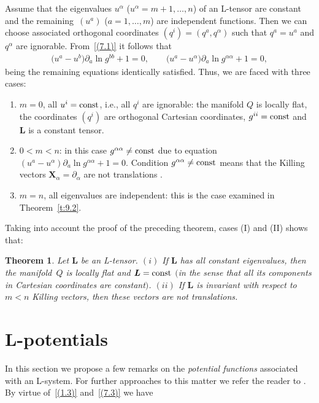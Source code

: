 \documentclass[10pt,a4paper]{amsart}
\def\bs{\boldsymbol}
\numberwithin{equation}{section}
\newtheorem{Theorem}{Theorem}[section]
 { \theoremstyle{definition}
\newtheorem{Notation}[Theorem]{Notation}
\newtheorem{Example}[Theorem]{Example}
\newtheorem{Remark}[Theorem]{Remark}
\newtheorem{Remarks}[Theorem]{Remarks}
 }
\begin{document}
Assume that the eigenvalues $u^\alpha$ ($u^\alpha=m+1,\ldots,n$) of an L-tensor are constant and the remaining~$(u^a)$ ($a=1,\ldots,m$) are independent functions. Then we can choose associated orthogonal coordinates $(q^i)=(q^a,q^\alpha)$ such that $q^a=u^a$ and $q^\alpha$ are ignorable. From~\eqref{(7.1)} it follows that
\begin{gather*}
\big(u^a-u^b\big) \partial_a\ln g^{bb}+1=0, \qquad
\big(u^a-u^\alpha\big) \partial_a\ln g^{\alpha\alpha}+1=0,
\end{gather*}
being the remaining equations identically satisf\/ied. Thus, we are faced with three cases:
\begin{enumerate}\itemsep=0pt
\item[(I)] $m=0$, all $u^i={\rm const}$, i.e., all $q^i$ are ignorable: the manifold $Q$ is locally f\/lat, the coordinates $(q^i)$
are orthogonal Cartesian coordinates, $g^{ii}={\rm const}$ and $\bs L$ is a constant tensor.

\item[(II)] $0<m<n$: in this case $g^{\alpha\alpha}\neq{\rm const}$ due to equation $(u^a-u^\alpha)\partial_a\ln g^{\alpha\alpha}+1=0$.
Condition $g^{\alpha\alpha}\neq{\rm const}$ means that the Killing vectors $\bs X_\alpha=\partial_\alpha$ are  not translations \cite[Section~52]{Eisenhart-1933}.

\item[(III)] $m=n$, all eigenvalues are independent: this is the case examined in Theorem~\ref{t:9.2}.
\end{enumerate}

Taking into account the proof of the preceding theorem, cases (I) and (II) shows that:

\begin{Theorem}\label{t:9.3}
Let $\bs L$ be an L-tensor.
$(i)$ If $\bs L$ has all constant eigenvalues, then the mani\-fold~$Q$ is locally flat and $\bs L={\rm const}$ $($in the sense that all its components in Cartesian coordinates are constant$)$.
$(ii)$ If $\bs L$ is invariant with respect to  $m<n$ Killing vectors, then these vectors are not translations.
\end{Theorem}


\section{L-potentials}\label{section10}

In this section we propose a few remarks on the {\it potential functions} associated with an L-system. For further approaches to this matter we refer the reader to \cite{Blaszak-Ma-2003, Ibort-Magri-Marmo-2000}. By virtue of~\eqref{(1.3)} and~\eqref{(7.3)} we have
\end{document}
